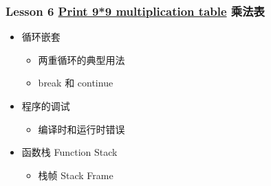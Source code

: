 \begin{frame}\frametitle{Lesson 6 \href{Lesson-6.md}{Print 9*9
multiplication table} 乘法表}

\begin{itemize}
\item
  循环嵌套
  \begin{itemize}
  \item
    两重循环的典型用法
  \item
    break 和 continue
  \end{itemize}
\item
  程序的调试
  \begin{itemize}
  \item
    编译时和运行时错误
  \end{itemize}
\item
  函数栈 Function Stack
  \begin{itemize}
  \item
    栈帧 Stack Frame
  \end{itemize}
\end{itemize}
\end{frame}
